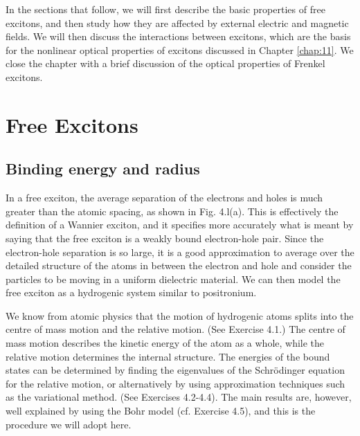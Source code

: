 \documentclass[12pt]{book}
\begin{document}
In the sections that follow, we will first describe the basic properties of free excitons, and then study how they are affected by external electric and magnetic fields. We will then discuss the interactions between excitons, which are the basis for the nonlinear optical properties of excitons discussed in Chapter \ref{chap:11}. We close the chapter with a brief discussion of the optical properties of Frenkel excitons.

\section{Free Excitons}
\subsection{Binding energy and radius}
In a free exciton, the average separation of the electrons and holes is much greater than the atomic spacing, as shown in Fig. 4.l(a). This is effectively the definition of a Wannier exciton, and it specifies more accurately what is meant by saying that the free exciton is a weakly bound electron-hole pair. Since the electron-hole separation is so large, it is a good approximation to average over the detailed structure of the atoms in between the electron and hole and consider the particles to be moving in a uniform dielectric material. We can then model the free exciton as a hydrogenic system similar to positronium.

We know from atomic physics that the motion of hydrogenic atoms splits into the centre of mass motion and the relative motion. (See Exercise 4.1.) The centre of mass motion describes the kinetic energy of the atom as a whole, while the relative motion determines the internal structure. The energies of the bound states can be determined by finding the eigenvalues of the Schr\"{o}dinger equation for the relative motion, or alternatively by using approximation techniques such as the variational method. (See Exercises 4.2-4.4). The main results are, however, well explained by using the Bohr model (cf. Exercise 4.5), and this is the procedure we will adopt here.
\end{document}

